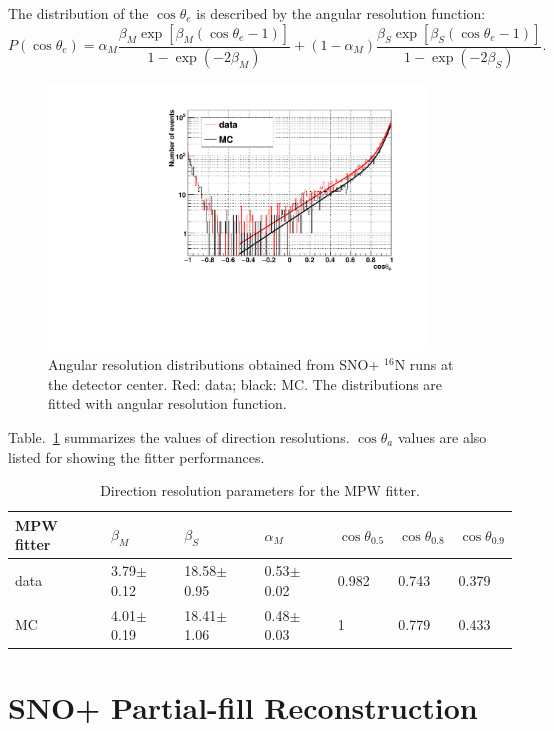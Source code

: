 \documentclass[preprint,12pt]{elsarticle}
\numberwithin{equation}{section}
\begin{document}
The distribution of the $\cos\theta_e$ is described by the angular resolution function\cite{boulay}:
\begin{equation}
P(\cos\theta_e)=\alpha_M\frac{\beta_M\exp[\beta_M(\cos\theta_e-1)]}{1-\exp(-2\beta_M)}+(1-\alpha_M)\frac{\beta_S\exp[\beta_S(\cos\theta_e-1)]}{1-\exp(-2\beta_S)}.
\end{equation}

\begin{figure}[!htb]
	\centering
	\includegraphics[width=10cm]{angularResol.pdf}
	\caption{Angular resolution distributions obtained from SNO+ {$^{16}$}N runs at the detector center. Red: data; black: MC. The distributions are fitted with angular resolution function.}
	\label{angularesol}
\end{figure}

Table.~\ref{directResol} summarizes the values of direction resolutions. $\cos\theta_a$ values are also listed for showing the fitter performances.

\begin{table}[ht]
	\centering
	\caption{Direction resolution parameters for the MPW fitter.}
	\label{directResol}
\begin{tabular}{|p{2.2cm}|p{1.8cm}|p{2cm}|p{2cm}|p{1.1cm}|p{1.1cm}|p{1.1cm}| }
\hline
MPW fitter& $\beta_M$ &  $\beta_S$ & $\alpha_M$ & $\cos\theta_{0.5}$ & $\cos\theta_{0.8}$& $\cos\theta_{0.9}$\\
\hline
data & 3.79$\pm$0.12 & 18.58$\pm$0.95 & 0.53$\pm$0.02& 0.982 & 0.743 & 0.379\\
\hline
MC &4.01$\pm$0.19 & 18.41$\pm$1.06 & 0.48$\pm$0.03 & 1 & 0.779 & 0.433  \\
\hline
\end{tabular}
\end{table}

\section{SNO+ Partial-fill Reconstruction}
\end{document}
